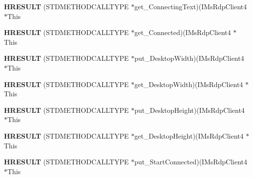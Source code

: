 \begin{DoxyCompactItemize}
\item 
\mbox{\label{struct_i_ms_rdp_client4_vtbl_aa4cd8436060d2b2a0d7b64b38a7e4fcf}} 
{\bfseries H\+R\+E\+S\+U\+LT} (S\+T\+D\+M\+E\+T\+H\+O\+D\+C\+A\+L\+L\+T\+Y\+PE $\ast$get\+\_\+\+Connecting\+Text)(I\+Ms\+Rdp\+Client4 $\ast$This
\item 
\mbox{\label{struct_i_ms_rdp_client4_vtbl_a711fd4651a37dc27ba7686742f704d83}} 
{\bfseries H\+R\+E\+S\+U\+LT} (S\+T\+D\+M\+E\+T\+H\+O\+D\+C\+A\+L\+L\+T\+Y\+PE $\ast$get\+\_\+\+Connected)(I\+Ms\+Rdp\+Client4 $\ast$This
\item 
\mbox{\label{struct_i_ms_rdp_client4_vtbl_aa5574d7f819dbc516f0d5d27e29b7fcb}} 
{\bfseries H\+R\+E\+S\+U\+LT} (S\+T\+D\+M\+E\+T\+H\+O\+D\+C\+A\+L\+L\+T\+Y\+PE $\ast$put\+\_\+\+Desktop\+Width)(I\+Ms\+Rdp\+Client4 $\ast$This
\item 
\mbox{\label{struct_i_ms_rdp_client4_vtbl_aa4f33b63ac7a1da2ee0c349943001d35}} 
{\bfseries H\+R\+E\+S\+U\+LT} (S\+T\+D\+M\+E\+T\+H\+O\+D\+C\+A\+L\+L\+T\+Y\+PE $\ast$get\+\_\+\+Desktop\+Width)(I\+Ms\+Rdp\+Client4 $\ast$This
\item 
\mbox{\label{struct_i_ms_rdp_client4_vtbl_aabcadbec72a4195a42f0f88925a85ced}} 
{\bfseries H\+R\+E\+S\+U\+LT} (S\+T\+D\+M\+E\+T\+H\+O\+D\+C\+A\+L\+L\+T\+Y\+PE $\ast$put\+\_\+\+Desktop\+Height)(I\+Ms\+Rdp\+Client4 $\ast$This
\item 
\mbox{\label{struct_i_ms_rdp_client4_vtbl_add4a1386d447ade4f0edc241ee1405e6}} 
{\bfseries H\+R\+E\+S\+U\+LT} (S\+T\+D\+M\+E\+T\+H\+O\+D\+C\+A\+L\+L\+T\+Y\+PE $\ast$get\+\_\+\+Desktop\+Height)(I\+Ms\+Rdp\+Client4 $\ast$This
\item 
\mbox{\label{struct_i_ms_rdp_client4_vtbl_aed2d16a45646c096a74ac34cefdb9cdf}} 
{\bfseries H\+R\+E\+S\+U\+LT} (S\+T\+D\+M\+E\+T\+H\+O\+D\+C\+A\+L\+L\+T\+Y\+PE $\ast$put\+\_\+\+Start\+Connected)(I\+Ms\+Rdp\+Client4 $\ast$This
\item 
\mbox{\label{struct_i_ms_rdp_client4_vtbl_ade59ed7f07f1ba9af7b961f3f757e694}} 

\end{DoxyCompactItemize}
